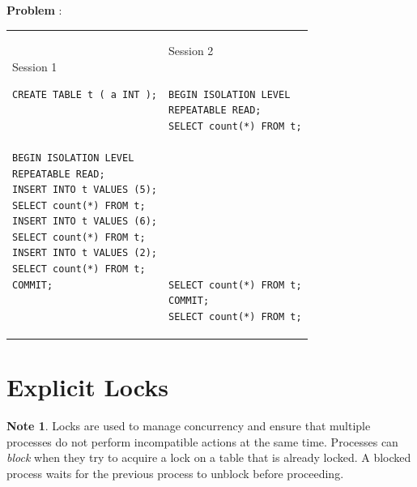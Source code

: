 \documentclass[10pt]{article}
\theoremstyle{definition}
\newtheorem{note}{Note}
\newcounter{ProblemCounter}
\newcommand{\nextproblem}{\filbreak\stepcounter{ProblemCounter} \noindent\textbf{Problem \theProblemCounter}:}
\begin{document}
\nextproblem
\begin{tcolorbox}
\begin{tabular}{p{3.25in}p{3in}}
\hspace{-0.2in}Session 1
\begin{lstlisting}
CREATE TABLE t ( a INT );



BEGIN ISOLATION LEVEL
REPEATABLE READ;
INSERT INTO t VALUES (5);
SELECT count(*) FROM t;
INSERT INTO t VALUES (6);
SELECT count(*) FROM t;
INSERT INTO t VALUES (2);
SELECT count(*) FROM t;
COMMIT;
  
\end{lstlisting}
    &
\hspace{-0.2in}Session 2
\begin{lstlisting}

BEGIN ISOLATION LEVEL
REPEATABLE READ;
SELECT count(*) FROM t;









SELECT count(*) FROM t;
COMMIT;
SELECT count(*) FROM t;
\end{lstlisting}
\end{tabular}
\vspace{-0.2in}
\end{tcolorbox}
\vspace{0.25in}

\section{Explicit Locks}

\begin{note}
Locks are used to manage concurrency and ensure that multiple processes do not perform incompatible actions at the same time.
Processes can \emph{block} when they try to acquire a lock on a table that is already locked.
A blocked process waits for the previous process to unblock before proceeding.
\end{note}
\end{document}
